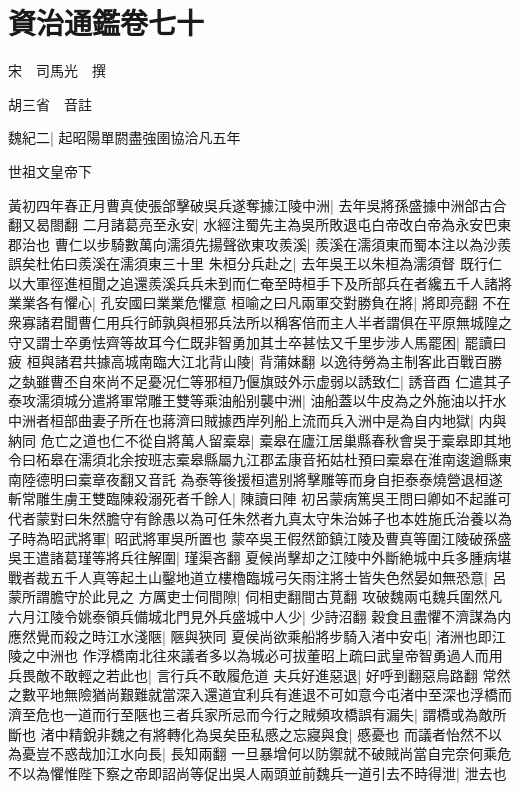 \section{資治通鑑卷七十}
宋　司馬光　撰

胡三省　音註

魏紀二|{
	起昭陽單閼盡強圉協洽凡五年}


世祖文皇帝下

黃初四年春正月曹真使張郃擊破吳兵遂奪據江陵中洲|{
	去年吳將孫盛據中洲郃古合翻又曷閤翻}
二月諸葛亮至永安|{
	水經注蜀先主為吳所敗退屯白帝改白帝為永安巴東郡治也}
曹仁以步騎數萬向濡須先揚聲欲東攻羨溪|{
	羨溪在濡須東而蜀本注以為沙羨誤矣杜佑曰羨溪在濡須東三十里}
朱桓分兵赴之|{
	去年吳王以朱桓為濡須督}
既行仁以大軍徑進桓聞之追還羨溪兵兵未到而仁奄至時桓手下及所部兵在者纔五千人諸將業業各有懼心|{
	孔安國曰業業危懼意}
桓喻之曰凡兩軍交對勝負在將|{
	將即亮翻}
不在衆寡諸君聞曹仁用兵行師孰與桓邪兵法所以稱客倍而主人半者謂俱在平原無城隍之守又謂士卒勇怯齊等故耳今仁既非智勇加其士卒甚怯又千里步涉人馬罷困|{
	罷讀曰疲}
桓與諸君共據高城南臨大江北背山陵|{
	背蒲妹翻}
以逸待勞為主制客此百戰百勝之埶雖曹丕自來尚不足憂况仁等邪桓乃偃旗豉外示虚弱以誘致仁|{
	誘音酉}
仁遣其子泰攻濡須城分遣將軍常雕王雙等乘油船别襲中洲|{
	油船蓋以牛皮為之外施油以扞水}
中洲者桓部曲妻子所在也蔣濟曰賊據西岸列船上流而兵入洲中是為自内地獄|{
	内與納同}
危亡之道也仁不從自將萬人留槖皋|{
	槖皋在廬江居巢縣春秋會吳于槖皋即其地令曰柘皋在濡須北余按班志槖皋縣屬九江郡孟康音拓姑杜預曰槖皋在淮南逡遒縣東南陸德明曰槖章夜翻又音託}
為泰等後援桓遣别將擊雕等而身自拒泰泰燒營退桓遂斬常雕生虜王雙臨陳殺溺死者千餘人|{
	陳讀曰陣}
初呂蒙病篤吳王問曰卿如不起誰可代者蒙對曰朱然膽守有餘愚以為可任朱然者九真太守朱治姊子也本姓施氏治養以為子時為昭武將軍|{
	昭武將軍吳所置也}
蒙卒吳王假然節鎮江陵及曹真等圍江陵破孫盛吳王遣諸葛瑾等將兵往解圍|{
	瑾渠吝翻}
夏候尚擊却之江陵中外斷絶城中兵多腫病堪戰者裁五千人真等起土山鑿地道立樓櫓臨城弓矢雨注將士皆失色然晏如無恐意|{
	呂蒙所謂膽守於此見之}
方厲吏士伺間隙|{
	伺相吏翻間古莧翻}
攻破魏兩屯魏兵圍然凡六月江陵令姚泰領兵備城北門見外兵盛城中人少|{
	少詩沼翻}
穀食且盡懼不濟謀為内應然覺而殺之時江水淺陿|{
	陿與狹同}
夏侯尚欲乘船將步騎入渚中安屯|{
	渚洲也即江陵之中洲也}
作浮橋南北往來議者多以為城必可拔董昭上疏曰武皇帝智勇過人而用兵畏敵不敢輕之若此也|{
	言行兵不敢履危道}
夫兵好進惡退|{
	好呼到翻惡烏路翻}
常然之數平地無險猶尚艱難就當深入還道宜利兵有進退不可如意今屯渚中至深也浮橋而濟至危也一道而行至陿也三者兵家所忌而今行之賊頻攻橋誤有漏失|{
	謂橋或為敵所斷也}
渚中精銳非魏之有將轉化為吳矣臣私慼之忘寢與食|{
	慼憂也}
而議者怡然不以為憂豈不惑哉加江水向長|{
	長知兩翻}
一旦暴增何以防禦就不破賊尚當自完奈何乘危不以為懼惟陛下察之帝即詔尚等促出吳人兩頭並前魏兵一道引去不時得泄|{
	泄去也}
